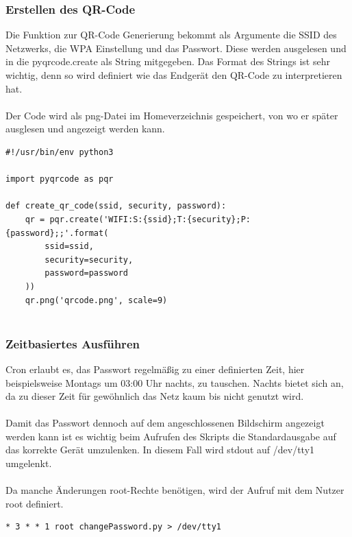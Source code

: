 \documentclass[a4paper,11pt,singlespacing]{article}
\begin{document}
    		\subsubsection{Erstellen des QR-Code}
    				Die Funktion zur QR-Code Generierung bekommt als Argumente die SSID des Netzwerks, die WPA Einstellung und das Passwort. Diese werden ausgelesen und in die pyqrcode.create als String mitgegeben. Das Format des Strings ist sehr wichtig, denn so wird definiert wie das Endgerät den QR-Code zu interpretieren hat.  \\ \\
				Der Code wird als png-Datei im Homeverzeichnis gespeichert, von wo er später ausglesen und angezeigt werden kann.\\ 


\begin{lstlisting}
#!/usr/bin/env python3

import pyqrcode as pqr
	
def create_qr_code(ssid, security, password):
    qr = pqr.create('WIFI:S:{ssid};T:{security};P:{password};;'.format(
        ssid=ssid,
        security=security,
        password=password
    ))
    qr.png('qrcode.png', scale=9)
    
\end{lstlisting}
    	
    		\subsubsection{Zeitbasiertes Ausführen}
    			Cron erlaubt es, das Passwort regelmäßig zu einer definierten Zeit, hier beispielsweise Montags um 03:00 Uhr nachts, zu tauschen. Nachts bietet sich an, da zu dieser Zeit für gewöhnlich das Netz kaum bis nicht genutzt wird. \\ \\
    			Damit das Passwort dennoch auf dem angeschlossenen Bildschirm angezeigt werden kann ist es wichtig beim Aufrufen des Skripts die Standardausgabe auf das korrekte Gerät umzulenken. In diesem Fall wird stdout auf /dev/tty1 umgelenkt. \\ \\
    			Da manche Änderungen root-Rechte benötigen, wird der Aufruf mit dem Nutzer root definiert.
    			\begin{lstlisting}
* 3 * * 1 root changePassword.py > /dev/tty1
    			\end{lstlisting}
    		
\end{document}
